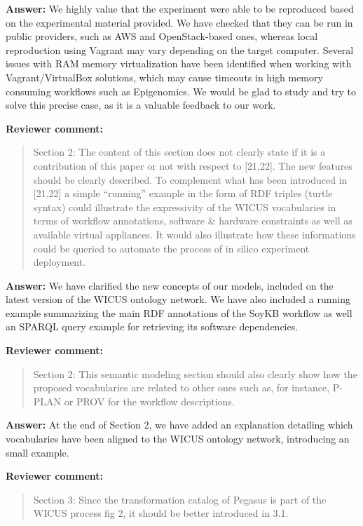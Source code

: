 \documentclass{letter}
\newenvironment{review}%
{\textbf{Reviewer comment:}\begin{quote}}%
{\end{quote}}%
\newcommand{\todo}[1]{%
      \color{red}\textbf{[TODO]} #1\color{black}}
\newcommand{\answer}[1]{%
      \textbf{Answer:} #1}
\begin{document}
\begin{letter}{}
\answer{We highly value that the experiment were able to be reproduced based on the experimental material provided. We have checked that they can be run in public providers, such as AWS and OpenStack-based ones, whereas local reproduction using Vagrant may vary depending on the target computer. Several issues with RAM memory virtualization have been identified when working with Vagrant/VirtualBox solutions, which may cause timeouts in high memory consuming workflows such as Epigenomics. We would be glad to study and try to solve this precise case, as it is a valuable feedback to our work.}


\begin{review}
Section 2: The content of this section does not clearly state if it is a contribution of this paper or not with respect to [21,22]. The new features should be clearly described. To complement what has been introduced in [21,22] a simple ``running'' example in the form of RDF triples (turtle syntax) could illustrate the expressivity of the WICUS vocabularies in terms of workflow annotations, software \& hardware constraints as well as available virtual appliances. It would also illustrate how these informations could be queried to automate the process of in silico experiment deployment.
\end{review}

\answer{We have clarified the new concepts of our models, included on the latest version of the WICUS ontology network. We have also included a running example summarizing the main RDF annotations of the SoyKB workflow as well an SPARQL query example for retrieving its software dependencies.}



\begin{review}
Section 2: This semantic modeling section should also clearly show how the proposed vocabularies are related to other ones such as, for instance, P-PLAN or PROV for the workflow descriptions.
\end{review}

\answer{At the end of Section 2, we have added an explanation detailing which vocabularies have been aligned to the WICUS ontology network, introducing an small example.}


\begin{review}
Section 3: Since the transformation catalog of Pegasus is part of the WICUS process fig 2, it should be better introduced in 3.1.
\end{review}


\end{letter}
\end{document}
